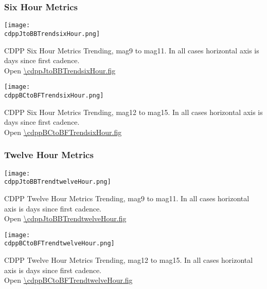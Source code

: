 \clearpage
\subsubsection{Six Hour Metrics}

\begin{center}
\texttt{[image: \\cdppJtoBBTrendsixHour.png]}
\end{center}
CDPP Six Hour Metrics Trending, mag9 to mag11. In all cases
horizontal axis is days since first cadence.\\
Open \url{\cdppJtoBBTrendsixHour.fig}

\clearpage
\begin{center}
\texttt{[image: \\cdppBCtoBFTrendsixHour.png]}
\end{center}
CDPP Six Hour Metrics Trending, mag12 to mag15. In all cases
horizontal axis is days since first cadence.\\
Open \url{\cdppBCtoBFTrendsixHour.fig}

\clearpage
\subsubsection{Twelve Hour Metrics}

\begin{center}
\texttt{[image: \\cdppJtoBBTrendtwelveHour.png]}
\end{center}
CDPP Twelve Hour Metrics Trending, mag9 to mag11. In all cases
horizontal axis is days since first cadence.\\
Open \url{\cdppJtoBBTrendtwelveHour.fig}

\clearpage
\begin{center}
\texttt{[image: \\cdppBCtoBFTrendtwelveHour.png]}
\end{center}
CDPP Twelve Hour Metrics Trending, mag12 to mag15. In all cases
horizontal axis is days since first cadence.\\
Open \url{\cdppBCtoBFTrendtwelveHour.fig}
